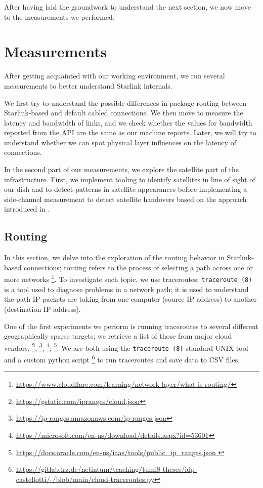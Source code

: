 \documentclass[IN,11pt,twoside,openright,idp,english]{tumthesis}
\begin{document}
After having laid the groundwork to understand the next section, we now move to the measurements we performed.
    
\chapter{Measurements}

After getting acquainted with our working environment, we run several measurements to better understand Starlink internals. 
    
We first try to understand the possible differences in package routing between Starlink-based and default cabled connections. We then move to measure the latency and bandwidth of links, and we check whether the values for bandwidth reported from the API are the same as our machine reports. Later, we will try to understand whether we can spot physical layer influences on the latency of connections.  
    
In the second part of our measurements, we explore the satellite part of the infrastructure. First, we implement tooling to identify satellites in line of sight of our dish and to detect patterns in satellite appearances before implementing a side-channel measurement to detect satellite handovers based on the approach introduced in \cite{izhikevich2023democratizing}.
    
\section{Routing}
    
In this section, we delve into the exploration of the routing behavior in Starlink-based connections; routing refers to the process of selecting a path across one or more networks \footnote{\url{https://www.cloudflare.com/learning/network-layer/what-is-routing/}}. To investigate such topic, we use traceroutes; \texttt{traceroute (8)}  is a tool used to diagnose problems in a network path; it is used to understand the path IP packets are taking from one computer (source IP address) to another (destination IP address).

One of the first experiments we perform is running traceroutes to several different geographically sparse targets; we retrieve a list of those from major cloud vendors, \footnote{\url{ https://gstatic.com/ipranges/cloud.json}}, \footnote{\url{https://ip-ranges.amazonaws.com/ip-ranges.json}}, \footnote{\url{https://microsoft.com/en-us/download/details.aspx?id=53601}}, \footnote{\url{https://docs.oracle.com/en-us/iaas/tools/public_ip_ranges.json }}. We are both using the \texttt{traceroute (8)} standard UNIX tool and a custom python script \footnote{\url{https://gitlab.lrz.de/netintum/teaching/tumi8-theses/idp-castellotti/-/blob/main/cloud-traceroutes.py}} to run traceroutes and save data to CSV files.
    
\end{document}
